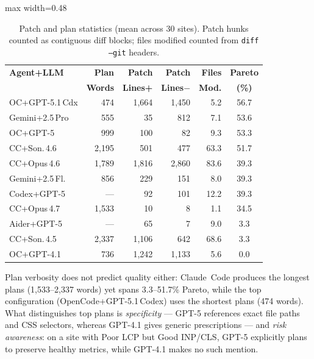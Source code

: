 \begin{table}[t]
\centering
\small
\caption{Patch and plan statistics (mean across 30 sites). Patch hunks counted as contiguous diff blocks; files modified counted from \texttt{diff --git} headers.}
\label{tab:patch-stats}
\begin{adjustbox}{max width=0.48\textwidth}
\begin{tabular}{lrrrrc}
\toprule
\textbf{Agent+LLM} & \textbf{Plan} & \textbf{Patch} & \textbf{Patch} & \textbf{Files} & \textbf{Pareto} \\
  & \textbf{Words} & \textbf{Lines+} & \textbf{Lines$-$} & \textbf{Mod.} & \textbf{(\%)} \\
\midrule
OC+GPT-5.1\,Cdx  & 474   & 1{,}664 & 1{,}450 & 5.2  & 56.7 \\
Gemini+2.5\,Pro   & 555   & 35      & 812     & 7.1  & 53.6 \\
OC+GPT-5          & 999   & 100     & 82      & 9.3  & 53.3 \\
CC+Son.\,4.6      & 2{,}195 & 501   & 477     & 63.3 & 51.7 \\
\midrule
CC+Opus\,4.6      & 1{,}789 & 1{,}816 & 2{,}860 & 83.6 & 39.3 \\
Gemini+2.5\,Fl.   & 856   & 229     & 151     & 8.0  & 39.3 \\
Codex+GPT-5       & ---   & 92      & 101     & 12.2 & 39.3 \\
CC+Opus\,4.7      & 1{,}533 & 10    & 8       & 1.1  & 34.5 \\
\midrule
Aider+GPT-5       & ---   & 65      & 7       & 9.0  &  3.3 \\
CC+Son.\,4.5      & 2{,}337 & 1{,}106 & 642   & 68.6 &  3.3 \\
OC+GPT-4.1        & 736   & 1{,}242 & 1{,}133 & 5.6  &  0.0 \\
\bottomrule
\end{tabular}
\end{adjustbox}
\end{table}

Plan verbosity does not predict quality either: Claude~Code produces the longest plans (1{,}533--2{,}337 words) yet spans 3.3--51.7\% Pareto, while the top configuration (OpenCode+GPT-5.1\,Codex) uses the shortest plans (474 words). What distinguishes top plans is \emph{specificity} --- GPT-5 references exact file paths and CSS selectors, whereas GPT-4.1 gives generic prescriptions --- and \emph{risk awareness}: on a site with Poor LCP but Good INP/CLS, GPT-5 explicitly plans to preserve healthy metrics, while GPT-4.1 makes no such mention.

